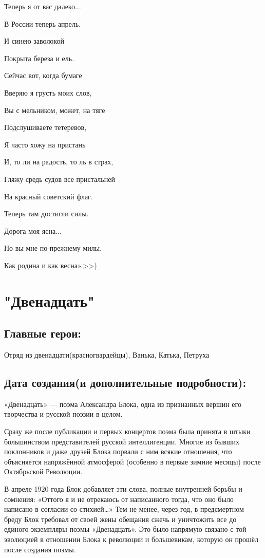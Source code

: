 \documentclass[a4paper,12pt]{article}
\begin{document}
	\noindent
	Теперь я от вас далеко...
	
	\noindent
	В России теперь апрель.
	
	\noindent
	И синею заволокой
	
	\noindent
	Покрыта береза и ель.
	
	\noindent
	Сейчас вот, когда бумаге
	
	\noindent
	Вверяю я грусть моих слов,
	
	\noindent
	Вы с мельником, может, на тяге
	
	\noindent
	Подслушиваете тетеревов,
	
	\noindent
	Я часто хожу на пристань
	
	\noindent
	И, то ли на радость, то ль в страх,
	
	\noindent
	Гляжу средь судов все пристальней
	
	\noindent
	На красный советский флаг.
	
	\noindent
	Теперь там достигли силы.
	
	\noindent
	Дорога моя ясна...
	
	\noindent
	Но вы мне по-прежнему милы,
	
	\noindent
	Как родина и как весна».>>)
	
	\section{"Двенадцать"}
	\subsection{Главные герои: }
	Отряд из двенадцати(красногвардейцы), Ванька, Катька, Петруха
	\subsection{Дата создания(и дополнительные подробности): }
	«Двенадцать» — поэма Александра Блока, одна из признанных вершин его творчества и русской поэзии в целом. 
	
	\noindent
	Сразу же после публикации и первых концертов поэма была принята в штыки большинством представителей русской интеллигенции. Многие из бывших поклонников и даже друзей Блока порвали с ним всякие отношения, что объясняется напряжённой атмосферой (особенно в первые зимние месяцы) после Октябрьской Революции.
	
	\noindent
	В апреле 1920 года Блок добавляет эти слова, полные внутренней борьбы и сомнения: «Оттого я и не отрекаюсь от написанного тогда, что оно было написано в согласии со стихией…» Тем не менее, через год, в предсмертном бреду Блок требовал от своей жены обещания сжечь и уничтожить все до единого экземпляры поэмы «Двенадцать». Это было напрямую связано с той эволюцией в отношении Блока к революции и большевикам, которую он прошёл после создания поэмы.
	
\end{document}
